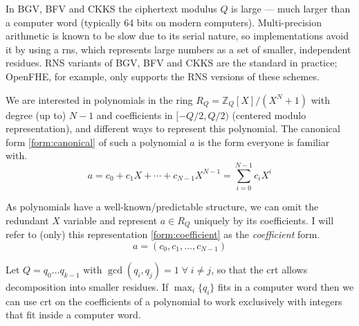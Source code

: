 In BGV, BFV and CKKS the ciphertext modulus $Q$ is large --- much larger than a computer word (typically 64 bits on modern computers). Multi-precision arithmetic is known to be slow due to its serial nature, so implementations avoid it by using a \gls{rns}, which represents large numbers as a set of smaller, independent residues. RNS variants of BGV, BFV and CKKS are the standard in practice; OpenFHE, for example, only supports the RNS versions of these schemes.

\begin{definition}
    We are interested in polynomials in the ring $R_Q = \mathbb{Z}_Q[X]/(X^N+1)$ with degree (up to) $N - 1$ and coefficients in $[-Q/2, Q/2)$ (centered modulo representation), and different ways to represent this polynomial. The canonical form \eqref{form:canonical} of such a polynomial $a$ is the form everyone is familiar with.
    \begin{equation}
        \label{form:canonical}
        a = c_0 + c_1X + \cdots + c_{N-1}X^{N-1} = \sum_{i=0}^{N-1} c_iX^i
    \end{equation}
\end{definition}

\begin{definition}
    As polynomials have a well-known/predictable structure, we can omit the redundant $X$ variable and represent $a\in R_Q$ uniquely by its coefficients. I will refer to (only) this representation \eqref{form:coefficient} as the \emph{coefficient} form.  
    \begin{equation}
        \label{form:coefficient}
        a = (c_0, c_1, \dots, c_{N-1})
    \end{equation}
\end{definition}

Let $Q = q_0\dots q_{k-1}$ with $\gcd(q_i, q_j) = 1 \;\forall\; i\not= j$, so that the \gls{crt} allows decomposition into smaller residues. If $\max_i\{q_i\}$ fits in a computer word then we can use \gls{crt} on the coefficients of a polynomial to work exclusively with integers that fit inside a computer word.

